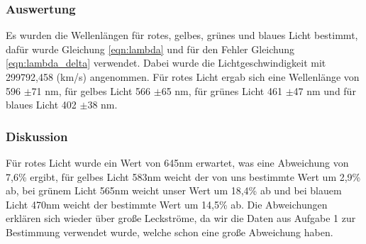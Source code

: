 \documentclass[12px]{scrartcl}
\begin{document}
\subsubsection{Auswertung}
Es wurden die Wellenlängen für rotes, gelbes, grünes und blaues Licht bestimmt, dafür wurde Gleichung \ref{eqn:lambda} und für den Fehler Gleichung \ref{eqn:lambda_delta} verwendet. Dabei wurde die Lichtgeschwindigkeit mit 299792,458 (km/s) angenommen. Für rotes Licht ergab sich eine Wellenlänge von 596 $\pm$71 nm, für gelbes Licht 566 $\pm$65 nm, für grünes Licht 461 $\pm$47 nm und für blaues Licht 402 $\pm$38 nm.

\subsubsection{Diskussion}
Für rotes Licht wurde ein Wert von 645nm erwartet, was eine Abweichung von 7,6\% ergibt, für gelbes Licht 583nm weicht der von uns bestimmte Wert um  2,9\% ab, bei grünem Licht 565nm weicht unser Wert um 18,4\% ab und bei blauem Licht 470nm weicht der bestimmte Wert um 14,5\% ab. Die Abweichungen erklären sich wieder über große Leckströme, da wir die Daten aus Aufgabe 1 zur Bestimmung verwendet wurde, welche schon eine große Abweichung haben.
\end{document}
